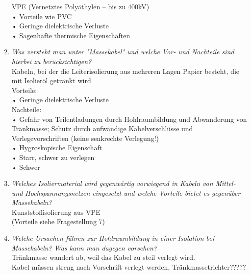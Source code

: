 \documentclass[12pt]{article}
\begin{document}
\begin{enumerate}
    VPE (Vernetztes Polyäthylen – bis zu 400kV)\\
    • Vorteile wie PVC\\
    • Geringe dielektrische Verluste\\
    • Sagenhafte thermische Eigenschaften\\
    \item \textit{Was versteht man unter "Massekabel" und welche 
    Vor- und Nachteile sind hierbei zu berücksichtigen?}\\
    Kabeln, bei der die Leiterisolierung aus mehreren Lagen Papier besteht, die mit Isolieröl getränkt wird\\
    Vorteile:\\
    • Geringe dielektrische Verluste\\
    Nachteile: \\
    • Gefahr von Teilentladungen durch Hohlraumbildung und Abwanderung von Tränkmasse; Schutz durch aufwändige Kabelverschlüsse und Verlegevorschriften (keine senkrechte Verlegung!)\\
    • Hygroskopische Eigenschaft\\
    • Starr, schwer zu verlegen\\
    • Schwer\\
    \item \textit{Welches Isoliermaterial wird gegenwärtig 
    vorwiegend in Kabeln von Mittel- und 
    Hochspannungsnetzen eingesetzt und welche 
    Vorteile bietet es gegenüber Massekabeln?}\\
    Kunststoffisolierung aus VPE  \\
    (Vorteile siehe Fragestellung 7)
    

    \item \textit{Welche Ursachen führen zur Hohlraumbildung in 
    einer Isolation bei Massekabeln? Was kann man 
    dagegen vorsehen?}\\ 
    Tränkmasse wandert ab, weil das Kabel zu steil verlegt wird. \\
    Kabel müssen streng nach Vorschrift verlegt werden, Tränkmassetrichter?????


\end{enumerate}
\end{document}
